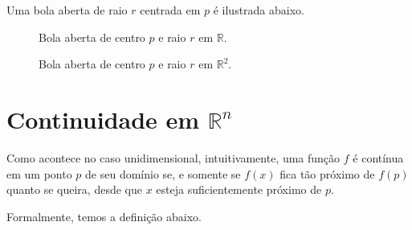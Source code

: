 Uma bola aberta de raio $r$ centrada em $p$ é ilustrada abaixo.

\begin{figure}[ht]
    \centering
    \caption{Bola aberta de centro $p$ e raio $r$ em $\mathbb R$.}
\end{figure}
\begin{figure}[ht]
    \centering
    \caption{Bola aberta de centro $p$ e raio $r$ em $\mathbb R^2$.}
\end{figure}
\section{Continuidade em $\mathbb R^n$}
Como acontece no caso unidimensional, intuitivamente, uma função $f$ é contínua em um ponto $p$ de seu domínio se, e somente se $f(x)$ fica tão próximo de $f(p)$ quanto se queira, desde que $x$ esteja suficientemente próximo de $p$.

Formalmente, temos a definição abaixo.

